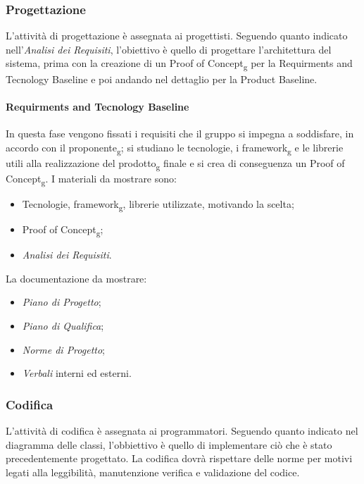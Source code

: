 \subsubsection{Progettazione} 
L’attività di progettazione è assegnata ai progettisti. Seguendo quanto indicato 
nell’\textit{Analisi dei Requisiti}, l’obiettivo è quello di progettare l’architettura del sistema, 
prima con la creazione di un Proof of Concept\textsubscript{g} per la Requirments and Tecnology Baseline e poi andando 
nel dettaglio per la Product Baseline.

\paragraph{Requirments and Tecnology Baseline} 
In questa fase vengono fissati i requisiti che il gruppo si impegna a soddisfare, in accordo con il 
proponente\textsubscript{g}; si studiano le tecnologie, i framework\textsubscript{g} e le librerie utili alla realizzazione del 
prodotto\textsubscript{g} finale e si crea di conseguenza un Proof of Concept\textsubscript{g}. I materiali da mostrare sono:
    \begin{itemize}
        \item Tecnologie, framework\textsubscript{g}, librerie utilizzate, motivando la scelta;
        \item Proof of Concept\textsubscript{g};
        \item \textit{Analisi dei Requisiti}.
    \end{itemize}
La documentazione da mostrare:
    \begin{itemize}
        \item \textit{Piano di Progetto};
        \item \textit{Piano di Qualifica};
        \item \textit{Norme di Progetto};
        \item \textit{Verbali} interni ed esterni.
    \end{itemize}

\subsubsection{Codifica}
L’attività di codifica è assegnata ai programmatori. Seguendo quanto indicato nel diagramma delle classi, l'obbiettivo è quello di implementare ciò che è stato precedentemente progettato.
La codifica dovrà rispettare delle norme per motivi legati alla leggibilità, manutenzione verifica e validazione del codice.
